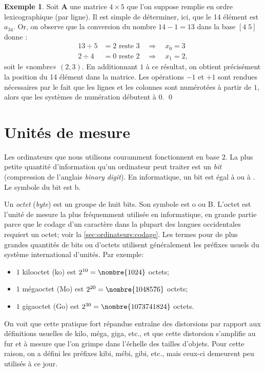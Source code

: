 \documentclass[letterpaper,11pt,english,french]{memoir}
\theoremstyle{plain}
\theoremstyle{definition}
\newtheorem{exemple}{Exemple}[chapter]
\theoremstyle{remark}
\begin{document}
\begin{exemple}
  \label{ex:ordinateurs:position_dans_matrice}
  Soit $\mathbf{A}$ une matrice $4 \times 5$ que l'on suppose remplie en
  ordre lexicographique (par ligne). Il est simple de déterminer, ici,
  que le 14{\ieme} élément est $a_{34}$. Or, on observe que la
  conversion du nombre $14 - 1 = 13$ dans la base $[4\; 5]$ donne :
  \begin{align*}
    13 \div 5 &= 2 \text{ reste } 3 \quad\Rightarrow\quad x_0 = 3 \\
     2 \div 4 &= 0 \text{ reste } 2 \quad\Rightarrow\quad x_1 = 2,
   \end{align*}
   soit le «nombre» $(2, 3)$. En additionnant $1$ à ce résultat, on
   obtient précisément la position du 14{\ieme} élément dans la
   matrice. Les opérations $-1$ et $+1$ sont rendues nécessaires par
   le fait que les lignes et les colonnes sont numérotées à partir de
   $1$, alors que les systèmes de numération débutent à $0$.%
   \qed
\end{exemple}



\section{Unités de mesure}
\label{sec:ordinateurs:unites}

Les ordinateurs que nous utilisons couramment fonctionnent en base $2$.
La plus petite quantité d'information qu'un ordinateur peut traiter
est un \emph{bit} (compression de l'anglais \emph{binary digit}). En
informatique, un bit est égal à  ou à . Le symbole du
bit est b.

Un \emph{octet} (\emph{byte}) est un groupe de huit bits. Son symbole
est o ou B. L'octet est l'unité de mesure la plus fréquemment utilisée
en informatique, en grande partie parce que le codage d'un caractère
dans la plupart des langues occidentales requiert un octet; voir la
\autoref{sec:ordinateurs:codage}. Les termes pour de plus grandes
quantités de bits ou d'octets utilisent généralement les préfixes
usuels du système international d'unités. Par exemple:
\begin{itemize}
\item $1$ kilooctet (ko) est $2^{10} = \nombre{1 024}$ octets;
\item $1$ mégaoctet (Mo) est $2^{20} = \nombre{1 048 576}$ octets;
\item $1$ gigaoctet (Go) est $2^{30} = \nombre{1 073 741 824}$ octets.
\end{itemize}
On voit que cette pratique fort répandue entraîne des distorsions par
rapport aux définitions usuelles de kilo, méga, giga, etc., et que
cette distorsion s'amplifie au fur et à mesure que l'on grimpe dans
l'échelle des tailles d'objets. Pour cette raison, on a défini les
préfixes kibi, mébi, gibi, etc., mais ceux-ci demeurent peu utilisés à
ce jour.
\end{document}
